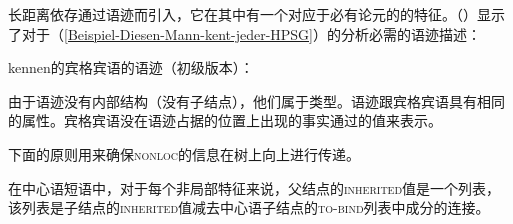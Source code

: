 长距离依存通过语迹而引入，它在其\slashlc 中有一个对应于必有论元的\localvc 的特征。（）显示了对于（\ref{Beispiel-Diesen-Mann-kent-jeder-HPSG}）的分析必需的语迹描述：

\eas
\label{le-spur-acc-o-kennen}
kennen的宾格宾语的语迹（初级版本）：\\
\zs

\noindent
由于语迹没有内部结构（没有子结点），他们属于类型。语迹跟宾格宾语具有相同的属性。宾格宾语没在语迹占据的位置上出现的事实通过\slaschc 的值来表示。 
%

下面的原则用来确保\textsc{nonloc}的信息在树上向上进行传递。

\begin{samepage}
\begin{principle-break}[非局部特征原则]
\label{Prinzip-der-Nichtlokalen-Merkmale}
在中心语短语中，对于每个非局部特征来说，父结点的\textsc{inherited}值是一个列表，该列表是子结点的\textsc{inherited}值减去中心语子结点的\textsc{to-bind}列表中成分的连接。
\end{principle-break}
\end{samepage}

